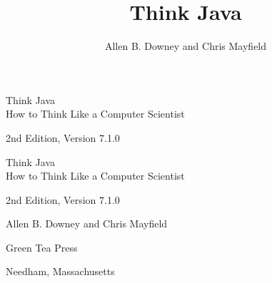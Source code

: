 \documentclass[12pt]{book}
\title{Think Java}
\author{Allen B. Downey and Chris Mayfield}
\newcommand{\thetitle}{Think Java}
\newcommand{\thesubtitle}{How to Think Like a Computer Scientist}
\newcommand{\theauthors}{Allen B. Downey and Chris Mayfield}
\newcommand{\theversion}{2nd Edition, Version 7.1.0}
\theoremstyle{exercise}
\newif\ifplastex
\begin{document}
\frontmatter

\ifplastex

\maketitle

\else

\begin{latexonly}

\thispagestyle{empty}

\begin{flushright}
\vspace*{2.0in}

\begin{spacing}{3}
{\huge \thetitle} \\
{\Large \thesubtitle}
\end{spacing}

\vspace{0.25in}

\theversion

\vfill
\end{flushright}

\newpage
\thispagestyle{empty}

\quad

\newpage
\thispagestyle{empty}

\begin{flushright}
\vspace*{2.0in}

\begin{spacing}{3}
{\huge \thetitle} \\
{\Large \thesubtitle}
\end{spacing}

\vspace{0.25in}

\theversion

\vspace{1in}

{\Large \theauthors}

\vspace{0.5in}

{\Large Green Tea Press}

{\small Needham, Massachusetts}

\vfill
\end{flushright}


\end{latexonly}
\end{document}
